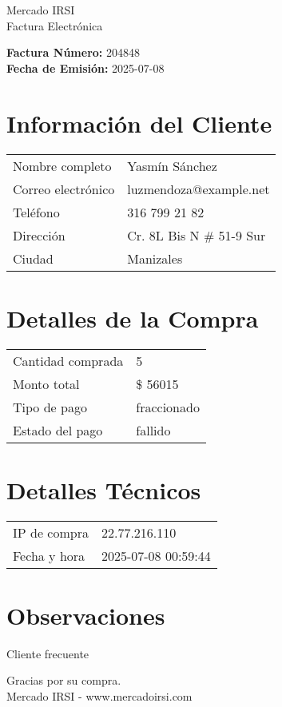 \documentclass[12pt]{article}
\begin{document}
\begin{center}
    \Huge Mercado IRSI \\
    \Large Factura Electrónica
\end{center}

\vspace{0.5cm}

\noindent \textbf{Factura Número:} 204848 \\
\textbf{Fecha de Emisión:} 2025-07-08

\vspace{0.5cm}

\section*{Información del Cliente}
\begin{longtable}{ll}
Nombre completo & Yasmín Sánchez \\
Correo electrónico & luzmendoza@example.net \\
Teléfono & 316 799 21 82 \\
Dirección & Cr. 8L Bis N \# 51-9 Sur \\
Ciudad & Manizales \\
\end{longtable}

\vspace{0.5cm}

\section*{Detalles de la Compra}
\begin{longtable}{ll}
Cantidad comprada & 5 \\
Monto total & \$ 56015 \\
Tipo de pago & fraccionado \\
Estado del pago & fallido \\
\end{longtable}

\vspace{0.5cm}

\section*{Detalles Técnicos}
\begin{longtable}{ll}
IP de compra & 22.77.216.110 \\
Fecha y hora & 2025-07-08 00:59:44 \\
\end{longtable}

\vspace{0.5cm}

\section*{Observaciones}
Cliente frecuente

\vspace{0.5cm}

\begin{center}
    Gracias por su compra. \\
    Mercado IRSI - www.mercadoirsi.com
\end{center}
\end{document}
